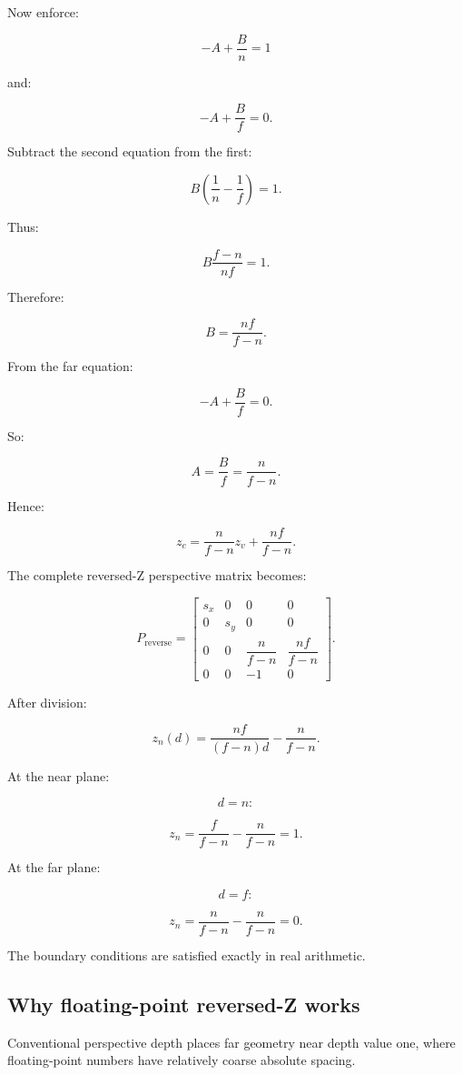 Now enforce:

\[
 -A+\frac Bn=1
\]

and:

\[
 -A+\frac Bf=0.
\]

Subtract the second equation from the first:

\[
 B\left(\frac1n-\frac1f\right)=1.
\]

Thus:

\[
 B\frac{f-n}{nf}=1.
\]

Therefore:

\[
 \boxed{ B=\frac{nf}{f-n} }.
\]

From the far equation:

\[
 -A+\frac Bf=0.
\]

So:

\[
 A=\frac Bf=\frac n{f-n}.
\]

Hence:

\[
 \boxed{ z_c= \frac n{f-n}z_v+ \frac{nf}{f-n} }.
\]

The complete reversed-Z perspective matrix becomes:

\[
 \boxed{ P_{\mathrm{reverse}}= \begin{bmatrix} s_x&0&0&0\\ 0&s_y&0&0\\ 0&0&\dfrac n{f-n}&\dfrac{nf}{f-n}\\ 0&0&-1&0 \end{bmatrix} }.
\]

After division:

\[
 \boxed{ z_n(d)= \frac{nf}{(f-n)d} -\frac n{f-n} }.
\]

At the near plane:

\[
 d=n:
\]

\[
 z_n= \frac f{f-n}-\frac n{f-n}=1.
\]

At the far plane:

\[
 d=f:
\]

\[
 z_n= \frac n{f-n}-\frac n{f-n}=0.
\]

The boundary conditions are satisfied exactly in real arithmetic.

\subsection{Why floating-point reversed-Z works}\label{02-foundations-ii-ch033-why-floating-point-reversed-z-works}

Conventional perspective depth places far geometry near depth value one, where floating-point numbers have relatively coarse absolute spacing.

